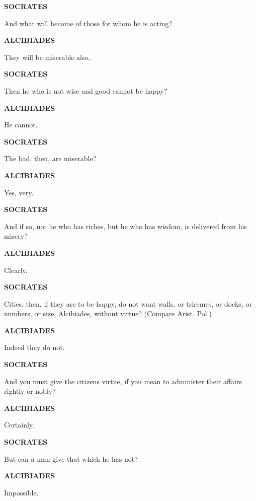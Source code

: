 \documentclass[11pt,letter]{article}
\begin{document}
\par \textbf{SOCRATES}
\par   And what will become of those for whom he is acting?

\par \textbf{ALCIBIADES}
\par   They will be miserable also.

\par \textbf{SOCRATES}
\par   Then he who is not wise and good cannot be happy?

\par \textbf{ALCIBIADES}
\par   He cannot.

\par \textbf{SOCRATES}
\par   The bad, then, are miserable?

\par \textbf{ALCIBIADES}
\par   Yes, very.

\par \textbf{SOCRATES}
\par   And if so, not he who has riches, but he who has wisdom, is delivered from his misery?

\par \textbf{ALCIBIADES}
\par   Clearly.

\par \textbf{SOCRATES}
\par   Cities, then, if they are to be happy, do not want walls, or triremes, or docks, or numbers, or size, Alcibiades, without virtue? (Compare Arist. Pol.)

\par \textbf{ALCIBIADES}
\par   Indeed they do not.

\par \textbf{SOCRATES}
\par   And you must give the citizens virtue, if you mean to administer their affairs rightly or nobly?

\par \textbf{ALCIBIADES}
\par   Certainly.

\par \textbf{SOCRATES}
\par   But can a man give that which he has not?

\par \textbf{ALCIBIADES}
\par   Impossible.
\end{document}
